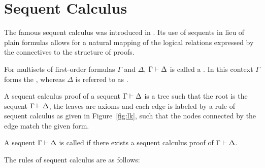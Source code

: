 \section{Sequent Calculus}
\label{sec:lk}

The famous sequent calculus was introduced in \cite{Gentzen}.
Its use of sequents in lieu of plain formulas allows for a natural mapping of the logical relations expressed by the connectives to the structure of proofs.

\begin{defi} 
	For multisets of first-order formulas $\Gamma$ and $\Delta$, $\Gamma \vdash \Delta$ is called a . 
	In this context $\Gamma$ forms the , whereas $\Delta$ is referred to as .

	A sequent calculus proof of a sequent $\Gamma \vdash \Delta$ is a tree such that the root is the sequent $\Gamma \vdash \Delta$, the leaves are axioms and each edge is labeled by a rule of sequent calculus as given in Figure~\ref{fig:lk}, such that the nodes connected by the edge match the given form. 

	A sequent $\Gamma \vdash \Delta$ is called  if there exists a sequent calculus proof of $\Gamma \proves\nolinebreak \Delta$.
\end{defi}

The rules of sequent calculus are as follows:

